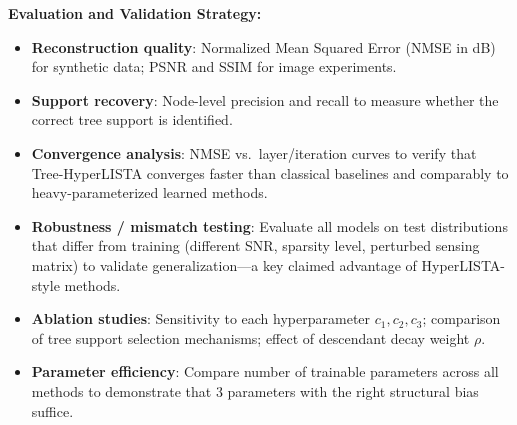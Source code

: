 \documentclass[11pt]{article}
\begin{document}
\textbf{Evaluation and Validation Strategy:}
\begin{itemize}[nosep, leftmargin=1.5em]
    \item \textbf{Reconstruction quality}: Normalized Mean Squared Error (NMSE in dB) for synthetic data; PSNR and SSIM for image experiments.
    \item \textbf{Support recovery}: Node-level precision and recall to measure whether the correct tree support is identified.
    \item \textbf{Convergence analysis}: NMSE vs.\ layer/iteration curves to verify that Tree-HyperLISTA converges faster than classical baselines and comparably to heavy-parameterized learned methods.
    \item \textbf{Robustness / mismatch testing}: Evaluate all models on test distributions that differ from training (different SNR, sparsity level, perturbed sensing matrix) to validate generalization---a key claimed advantage of HyperLISTA-style methods.
    \item \textbf{Ablation studies}: Sensitivity to each hyperparameter $c_1, c_2, c_3$; comparison of tree support selection mechanisms; effect of descendant decay weight $\rho$.
    \item \textbf{Parameter efficiency}: Compare number of trainable parameters across all methods to demonstrate that 3 parameters with the right structural bias suffice.
\end{itemize}
\end{document}
